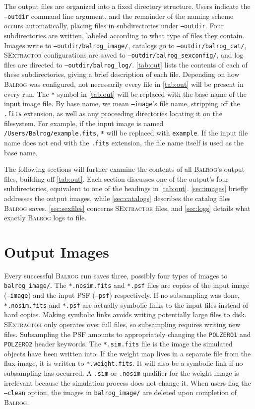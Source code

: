 \documentclass[11pt]{book}
\newcommand{\codett}[1]{\texttt{#1}}
\newcommand{\balrog}{\textsc{Balrog}}
\newcommand{\sex}{\textsc{SExtractor}}
\newcommand{\opt}[1]{\codett{--#1}}
\begin{document}
The output files are organized into a fixed directory structure.
Users indicate the \opt{outdir} command line argument, and
the remainder of the naming scheme occurs automatically,
placing files in subdirectories under \opt{outdir}.
Four subdirectories are written, labeled according to what
type of files they contain. 
Images write to \opt{outdir}\codett{/balrog\_image/}, 
catalogs go to \opt{outdir}\codett{/balrog\_cat/},
\sex{} configurations are saved to \opt{outdir}\codett{/balrog\_sexconfig/},
and log files are directed to \opt{outdir}\codett{/balrog\_log/}.
\autoref{tab:out} lists the contents of each of these subdirectories,
giving a brief description of each file. Depending on how
\balrog{} was configured, not necessarily every file
in \autoref{tab:out} will be present in every run.
The \codett{*} symbol in \autoref{tab:out} will be replaced with
the base name of the input image file.
By base name, we mean \opt{image}'s file name, stripping off the \codett{.fits} extension,
as well as any proceeding directories locating it on the filesystem.
For example,
if the input image is named \codett{/Users/Balrog/example.fits},
\codett{*} will be replaced with \codett{example}.
If the input file name does not end with the \codett{.fits}
extension, the file name itself is used as the base name.

The following sections will further examine the contents of 
all \balrog{}'s output files, building off \autoref{tab:out}.
Each section discusses one of the output's four subdirectories,
equivalent to one of the headings in \autoref{tab:out}.
\autoref{sec:images} briefly addresses the output images,
while \autoref{sec:catalogs} describes the catalog files \balrog{} saves.
\autoref{sec:sexfiles} concerns \sex{} files, and
\autoref{sec:logs} details what exactly \balrog{} logs to file.

\section{Output Images}
\label{sec:images}

Every successful \balrog{} run saves three, possibly four types of images to \codett{balrog\_image/}.
The \codett{*.nosim.fits} and \codett{*.psf} files are copies of the 
input image (\opt{image}) and the input PSF (\opt{psf}) respectively.
If no subsampling was done, \codett{*.nosim.fits} and \codett{*.psf} are actually symbolic links to the input files instead of hard copies. 
Making symbolic links avoids writing potentially large files to disk. %
\sex{} only operates over full files, so subsampling requires writing new files.
Subsampling the PSF amounts to appropriately changing the 
\codett{POLZERO1} and \codett{POLZERO2} header keywords.
The \codett{*.sim.fits} file is the image the simulated objects have been written into.
If the weight map lives in a separate file from the flux image, it is written to \codett{*.weight.fits}. 
It will also be a symbolic link if no subsampling has occurred.
A \codett{.sim} or \codett{.nosim} qualifier for the weight image is irrelevant because the simulation process does not change it.
When users flag the \opt{clean} option, the images in \codett{balrog\_image/} are deleted upon completion of \balrog{}.
\end{document}

